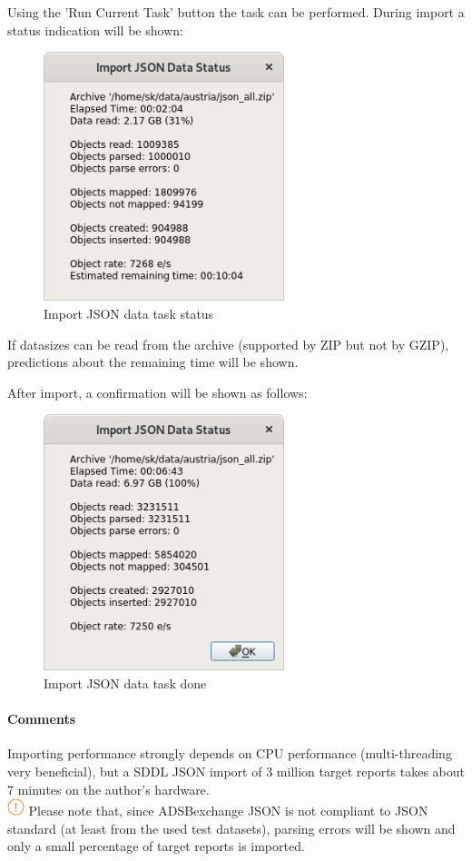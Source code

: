 Using the 'Run Current Task' button the task can be performed. During import a status indication will be shown:

\begin{figure}[H]
  \center
    \includegraphics[width=7cm]{../screenshots/json_import_status.png}
  \caption{Import JSON data task status}
\end{figure}

If datasizes can be read from the archive (supported by ZIP but not by GZIP), predictions about the remaining time will be shown.

After import, a confirmation will be shown as follows:

\begin{figure}[H]
  \center
    \includegraphics[width=7cm,frame]{../screenshots/json_import_done.png}
  \caption{Import JSON data task done}
\end{figure}

\paragraph{Comments}

Importing performance strongly depends on CPU performance (multi-threading very beneficial), but a SDDL JSON import of 3 million target reports takes about 7 minutes on the author's hardware. \\

\includegraphics[width=0.5cm]{../../data/icons/hint.png} Please note that, since ADSBexchange JSON is not compliant to JSON standard (at least from the used test datasets), parsing errors will be shown and only a small percentage of target reports is imported.
